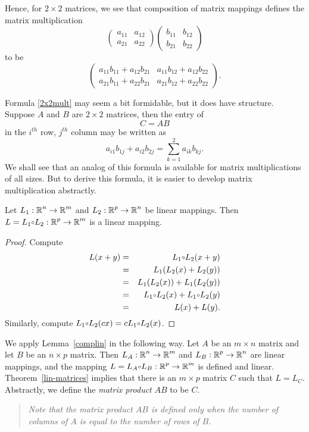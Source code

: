 \documentclass{ximera}
\begin{document}
Hence, for $2\times 2$ matrices, we see that composition of
matrix mappings defines the matrix multiplication
\begin{equation*}
\left(\begin{array}{rr} a_{11} & a_{12}\\ a_{21} &
a_{22}\end{array}\right)
\left(\begin{array}{rr} b_{11} & b_{12}\\ b_{21} &
b_{22}\end{array}\right)
\end{equation*}
to be
\begin{equation}  \label{2x2mult}
\left(\begin{array}{rr} a_{11}b_{11}+a_{12}b_{21} &
a_{11}b_{12}+a_{12}b_{22}
\\ a_{21}b_{11}+a_{22}b_{21} & a_{21}b_{12}+a_{22}b_{22}
\end{array}\right).
\end{equation}

Formula \eqref{2x2mult} may seem a bit formidable, but it does
have structure.  Suppose $A$ and $B$ are $2\times 2$ matrices,
then the entry of
\[
C=AB
\]
in the $i^{th}$ row, $j^{th}$ column may be written as
\[
a_{i1}b_{1j} + a_{i2}b_{2j} = \sum_{k=1}^2 a_{ik}b_{kj}.
\]
We shall see that an analog of this formula is available for
matrix multiplications of all sizes.  But to derive this
formula, it is easier to develop matrix multiplication
abstractly.


\begin{lemma}  \label{complin}
Let $L_1:\mbox{$\Bbb{R}$}^n\to\mbox{$\Bbb{R}$}^m$ and $L_2:\mbox{$\Bbb{R}$}^p\to\mbox{$\Bbb{R}$}^n$ be linear mappings.
Then $L=L_1\compose L_2:\R^p\to\R^m$ is a linear mapping.
\end{lemma}

\begin{proof}  Compute
\begin{eqnarray*}
L(x+y) & = & L_1\compose L_2(x+y)\\
 & = & L_1(L_2(x)+L_2(y)) \\
 & = & L_1(L_2(x)) + L_1(L_2(y))\\
 & = & L_1\compose L_2(x) + L_1\compose L_2(y)\\
 & = & L(x) + L(y).
\end{eqnarray*}
Similarly, compute $L_1\compose L_2(cx) = cL_1\compose L_2(x)$.
\end{proof}

We apply Lemma~\ref{complin} in the following way.  Let $A$ be
an $m\times n$ matrix and let $B$ be an $n\times p$
matrix.  Then $L_A:\mbox{$\Bbb{R}$}^n\to\mbox{$\Bbb{R}$}^m$ and $L_B:\mbox{$\Bbb{R}$}^p\to\mbox{$\Bbb{R}$}^n$ are linear
mappings, and the mapping $L=L_A\compose L_B:\R^p\to\R^m$ is
defined and linear.  Theorem~\ref{lin-matrices} implies that
there is an $m\times p$ matrix $C$ such that $L=L_C$.
Abstractly, we define the {\em matrix product\/} 
$AB$ to be $C$.
\begin{quote}
{\em Note that the matrix product $AB$ is defined only when the number of
columns of $A$ is equal to the number of rows of $B$.}
\end{quote}
\end{document}
